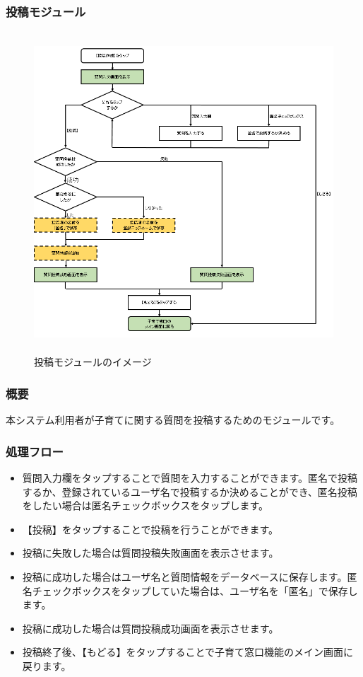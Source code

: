 \documentclass[a4j]{jarticle}
\begin{document}
\subsubsection{投稿モジュール\label{投稿}} %
\begin{figure}[H]
    \begin{center}
      \includegraphics[height = 12.0cm] {子育て窓口_投稿.png} %
    \caption {投稿モジュールのイメージ}
    \label{functionselection}
    \end{center}
\end{figure}
\subsubsection*{概要}
本システム利用者が子育てに関する質問を投稿するためのモジュールです。
\subsubsection*{処理フロー}
\begin{itemize}
\item 質問入力欄をタップすることで質問を入力することができます。匿名で投稿するか、登録されているユーザ名で投稿するか決めることができ、匿名投稿をしたい場合は匿名チェックボックスをタップします。
\item 【投稿】をタップすることで投稿を行うことができます。
\item 投稿に失敗した場合は質問投稿失敗画面を表示させます。
\item 投稿に成功した場合はユーザ名と質問情報をデータベースに保存します。匿名チェックボックスをタップしていた場合は、ユーザ名を「匿名」で保存します。
\item 投稿に成功した場合は質問投稿成功画面を表示させます。
\item 投稿終了後、【もどる】をタップすることで子育て窓口機能のメイン画面に戻ります。

\end{itemize}
\end{document}
